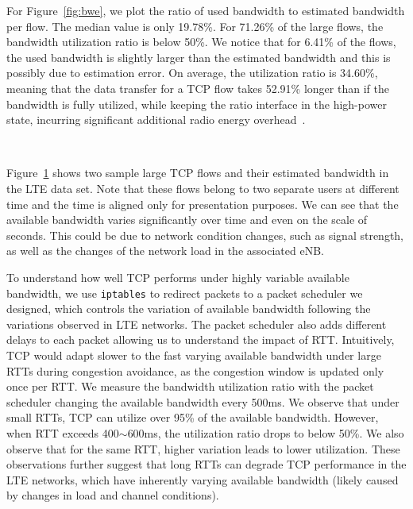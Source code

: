 For Figure~\ref{fig:bwe}, we plot the ratio of used bandwidth to estimated bandwidth per flow. The median value is only 19.78\%. For 71.26\% of the large flows, the bandwidth utilization ratio is below 50\%. We notice that for 6.41\% of the flows, the used bandwidth is slightly larger than the estimated bandwidth and this is possibly due to estimation error. On average, the utilization ratio is 34.60\%, meaning that the data transfer for a TCP flow takes 52.91\% longer than if the bandwidth is fully utilized, while keeping the ratio interface in the high-power state, incurring significant additional radio energy overhead~\cite{huang12_mobisys}.


\begin{figure}[t]
\centering
{}\\
\label{fig:bwe.sample}
\end{figure}

Figure~\ref{fig:bwe.sample} shows two sample large TCP flows and their estimated bandwidth in the LTE data set. Note that these flows belong to two separate users at different time and the time is aligned only for presentation purposes. We can see that the available bandwidth varies significantly over time and even on the scale of seconds. This could be due to network condition changes, such as signal strength, as well as the changes of the network load in the associated eNB.

To understand how well TCP performs under highly variable available bandwidth, we use \texttt{iptables} to redirect packets to a packet scheduler we designed, which controls the variation of available bandwidth following the variations observed in LTE networks. The packet scheduler also adds different delays to each packet allowing us to understand the impact of RTT. Intuitively, TCP would adapt slower to the fast varying available bandwidth under large RTTs during congestion avoidance, as the congestion window is updated only once per RTT. We measure the bandwidth utilization ratio with the packet scheduler changing the available bandwidth every 500ms. We observe that under small RTTs, TCP can utilize over 95\% of the available bandwidth. However, when RTT exceeds 400$\sim$600ms, the utilization ratio drops to below 50\%. We also observe that for the same RTT, higher variation leads to lower utilization. These observations further suggest that long RTTs can degrade TCP performance in the LTE networks, which have inherently varying available bandwidth (likely caused by changes in load and channel conditions).





